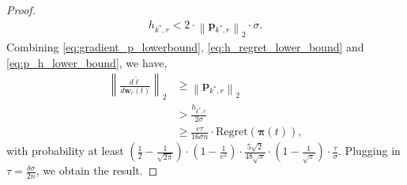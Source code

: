 \documentclass[10pt]{article}
\def\rvw{{\mathbf{w}}}
\def\rvp{{\mathbf{p}}}
\def\regret{{\text{Regret}}}
\def\rvpi{{\boldsymbol{\pi}}}
\begin{document}
\begin{proof}
\begin{equation}
\label{eq:p_h_lower_bound}
\begin{split}
	h_{k^*,r} < 2 \cdot \left\| \rvp_{k^*, r} \right\|_2 \cdot \sigma.
\end{split}
\end{equation}
Combining \cref{eq:gradient_p_lowerbound}, \cref{eq:h_regret_lower_bound} and \cref{eq:p_h_lower_bound}, we have,
\begin{equation*}
\begin{split}
	\left\| \frac{d\tilde{\ell}}{d \rvw_r(t)} \right\|_2 &\ge \left\| \rvp_{k^*, r}\right\|_2 \\
	&> \frac{h_{k^*,r}}{2\sigma} \\
	&\ge \frac{c\tau}{16\sigma n} \cdot \regret(\rvpi(t)),
\end{split}
\end{equation*}
with probability at least $\left( \frac{1}{2} - \frac{1}{\sqrt{2\pi}} \right) \cdot \left( 1 - \frac{1}{e^2} \right) \cdot \frac{5\sqrt{2}}{48\sqrt{\pi}} \cdot \left( 1 - \frac{1}{\sqrt{\pi}} \right) \cdot \frac{\tau}{\sigma}$. Plugging in $\tau = \frac{\delta\sigma}{2n}$, we obtain the result.
\end{proof}
\end{document}

